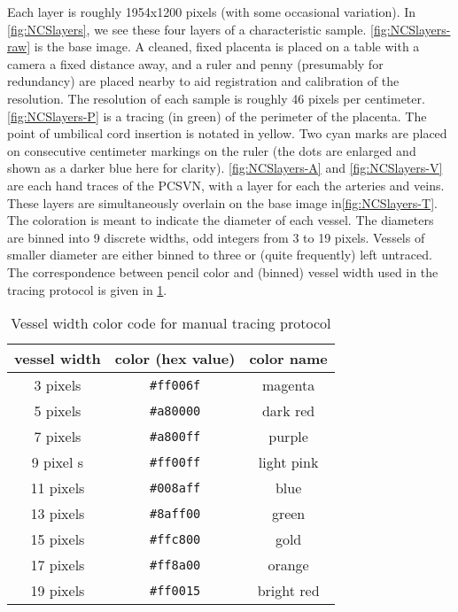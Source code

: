 Each layer is roughly 1954x1200 pixels (with some occasional variation).
In \cref{fig:NCSlayers}, we see these four layers of a characteristic sample. \cref{fig:NCSlayers-raw} is the base image. A cleaned, fixed placenta is placed on a table with a camera a fixed distance away, and a ruler and penny (presumably for redundancy) are placed nearby to aid registration and calibration of the resolution. The resolution of each sample is roughly 46 pixels per centimeter.
\cref{fig:NCSlayers-P} is a tracing (in green) of the perimeter of the placenta. The point of umbilical cord insertion is notated in yellow. Two cyan marks are placed on consecutive centimeter markings on the ruler (the dots are enlarged and shown as a darker blue here for clarity).
\cref{fig:NCSlayers-A} and \cref{fig:NCSlayers-V} are each hand traces of the PCSVN, with a layer for each the arteries and veins. These layers are simultaneously overlain on the base image in\cref{fig:NCSlayers-T}. The coloration is meant to indicate the diameter of each vessel. The diameters are binned into 9 discrete widths, odd integers from 3 to 19 pixels. Vessels of smaller diameter are either binned to three or (quite frequently) left untraced. The correspondence between pencil color and (binned) vessel width used in the tracing protocol is given in \cref{tab:widthcolors}.

\begin{table}
    \centering
\begin{tabular}{ccc}
    \hline
    \rule[-1ex]{0pt}{2.5ex}
    vessel width & color (hex value) & color name \\
    \hline 
    \rule[-1ex]{0pt}{2.5ex}
    3 pixels &  \texttt{\#ff006f} &   magenta \\                                      
    \rule[-1ex]{0pt}{2.5ex}
    5 pixels & \texttt{\#a80000}  & dark red \\                                      
    \rule[-1ex]{0pt}{2.5ex}
    7 pixels &  \texttt{\#a800ff} & purple \\                                          
    \rule[-1ex]{0pt}{2.5ex}
    9 pixel s&  \texttt{\#ff00ff}  & light pink \\
    \rule[-1ex]{0pt}{2.5ex}
    11 pixels &  \texttt{\#008aff} & blue \\                                          
    \rule[-1ex]{0pt}{2.5ex}
    13 pixels &  \texttt{\#8aff00} &   green \\                                        
    \rule[-1ex]{0pt}{2.5ex}
    15 pixels &  \texttt{\#ffc800} &  gold \\                                    
    \rule[-1ex]{0pt}{2.5ex}
    17 pixels & \texttt{\#ff8a00}  &  orange \\                                         
    \rule[-1ex]{0pt}{2.5ex}
    19 pixels & \texttt{\#ff0015}   &  bright red  \\
    \hline
\end{tabular}
\caption{Vessel width color code for manual tracing protocol}
\label{tab:widthcolors}
\end{table}


